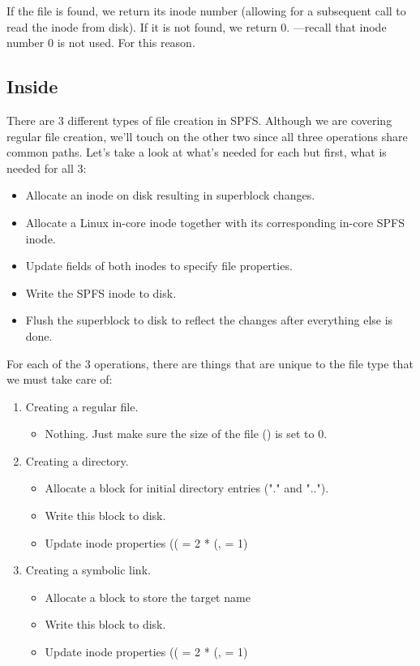 \noindent
If the file is found, we return its inode number (allowing for a subsequent call to read the inode from disk). If it is not found, we return 0. ---recall that inode number 0 is not used. For this reason.


\subsection{Inside }\label{create-file}

There are 3 different types of file creation in SPFS. Although we are covering regular file creation, we'll touch on the other two since all three operations share common paths. Let's take a look at what's needed for each but first, what is needed for all 3:

\begin{itemize}
	\item Allocate an inode on disk resulting in superblock changes.
	\item Allocate a Linux in-core inode together with its corresponding in-core SPFS inode.
	\item Update fields of both inodes to specify file properties.
	\item Write the SPFS inode to disk.
	\item Flush the superblock to disk to reflect the changes after everything else is done.
\end{itemize}

\noindent
For each of the 3 operations, there are things that are unique to the file type that we must take care of:
		
\begin{enumerate}
	\item Creating a regular file.
		\begin{itemize}
			\item Nothing. Just make sure the size of the file () is set to 0.
		\end{itemize}
	\item Creating a directory.
		\begin{itemize}
			\item Allocate a block for initial directory entries ("." and "..").
			\item Write this block to disk.
			\item Update inode properties (( = 2 * (, 
				 = 1)
		\end{itemize}
	\item Creating a symbolic link.
		\begin{itemize}
			\item Allocate a block to store the target name
			\item Write this block to disk.
			\item Update inode properties (( = 2 * (, 
				 = 1)
		\end{itemize}
\end{enumerate}

